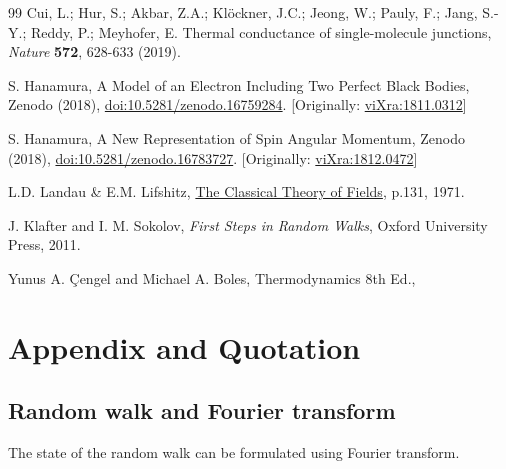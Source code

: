 \documentclass[reprint,amsmath,amssymb,aps,]{revtex4-1}
\numberwithin{equation}{section}%
\begin{document}
        

 

\begin{thebibliography}{99}
     Cui, L.; Hur, S.; Akbar, Z.A.; Klöckner, J.C.; Jeong, W.; Pauly, F.; Jang, S.-Y.; Reddy, P.; Meyhofer, E. Thermal conductance of single-molecule junctions, \textit{Nature} \textbf{572},  628-633 (2019).
    
     S. Hanamura, A Model of an Electron Including Two Perfect Black Bodies, Zenodo (2018), \href{https://doi.org/10.5281/zenodo.16759284}{doi:10.5281/zenodo.16759284}. [Originally: \href{http://vixra.org/abs/1811.0312}{viXra:1811.0312}]
    
     S. Hanamura, A New Representation of Spin Angular Momentum, Zenodo (2018), \href{https://doi.org/10.5281/zenodo.16783727}{doi:10.5281/zenodo.16783727}. [Originally: \href{http://vixra.org/abs/1812.0472}{viXra:1812.0472}]
    
     L.D. Landau \& E.M. Lifshitz, \href{https://archive.org/details/TheClassicalTheoryOfFields/page/n141}{The Classical Theory of Fields}, p.131, 1971.
    
     J. Klafter and I. M. Sokolov, \textit{First Steps in Random Walks}, Oxford University Press, 2011.
    
     Yunus A. \c{C}engel and Michael A. Boles, Thermodynamics 8th Ed.,
\end{thebibliography}

\section{Appendix and Quotation}
\label{Appendix}

\subsection{Random walk and Fourier transform}

    The state of the random walk can be formulated using Fourier transform.
    
\end{document}
